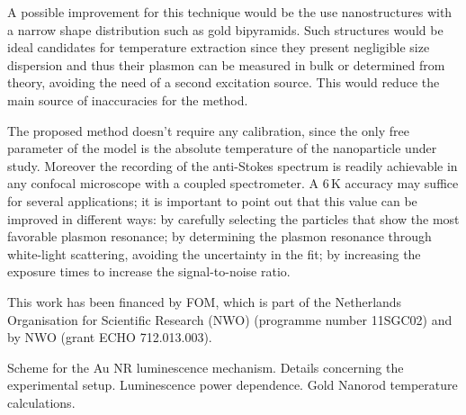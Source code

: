 \documentclass[journal=nalefd,manuscript=letter]{achemso}
\newcommand{\K}{\ensuremath{\,\textrm{K}}}
\begin{document}
A possible improvement for this technique would be the use nanostructures with a
narrow shape distribution such as gold bipyramids\cite{Pelton2009}. Such
structures would be ideal candidates for temperature extraction since they
present negligible size dispersion and thus their plasmon can be measured in
bulk or determined from theory, avoiding the need of a second excitation source.
This would reduce the main source of inaccuracies for the method.

The proposed method doesn't require any calibration, since the only free
parameter of the model is the absolute temperature of the nanoparticle under
study. Moreover the recording of the anti-Stokes spectrum is readily achievable
in any confocal microscope with a coupled spectrometer. A $6\K$ accuracy may
suffice for several applications; it is important to point out that this value
can be improved in different ways: by carefully selecting the particles that
show the most favorable plasmon resonance; by determining the plasmon resonance
through white-light scattering, avoiding the uncertainty in the fit; by
increasing the exposure times to increase the signal-to-noise ratio.

\begin{acknowledgement}
This work has been financed by FOM, which is part of the Netherlands Organisation for Scientific Research (NWO)
(programme number 11SGC02) and by NWO (grant ECHO 712.013.003). 
\end{acknowledgement}

\begin{suppinfo}
Scheme for the Au NR luminescence mechanism.  Details concerning the experimental setup. 
Luminescence power dependence. Gold Nanorod temperature calculations.
\end{suppinfo}



\end{document}
